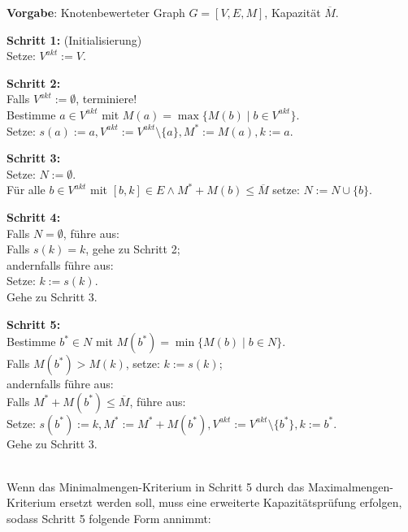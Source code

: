 \newpage
\begin{algo}
\label{Algo Huborientiertes Verfahren TS}
\textbf{Vorgabe}: Knotenbewerteter Graph $G=[V,E,M]$, Kapazität $\overline{M}$.

\noindent 
\textbf{Schritt 1:} (Initialisierung)\\
\phantom \quad Setze: $V^{akt} := V$.

\noindent 
\textbf{Schritt 2:}\\
\phantom \quad Falls $V^{akt} := \emptyset$, terminiere!\\
\phantom \quad Bestimme $a \in V^{akt}$ mit $M(a) = \max\{M(b) \mid b \in V^{akt}\}$.\\
\phantom \quad Setze: $s(a) := a, V^{akt} := V^{akt} \setminus \{a\}, M^* := M(a), k := a$.

\noindent 
\textbf{Schritt 3:}\\
\phantom \quad Setze: $N := \emptyset$.\\
\phantom \quad Für alle $b \in V^{akt}$ mit $[b,k] \in E \wedge M^* + M(b) \leq \overline{M}$ setze: $N := N \cup \{b\}$.

\noindent 
\textbf{Schritt 4:}\\
\phantom \quad Falls $N = \emptyset$, führe aus:\\
\phantom \quad \qquad Falls $s(k) = k$, gehe zu Schritt 2;\\
\phantom \quad \qquad andernfalls führe aus:\\
\phantom \quad \qquad \qquad Setze: $k := s(k)$.\\
\phantom \quad \qquad \qquad Gehe zu Schritt 3.

\noindent 
\textbf{Schritt 5:}\\
\phantom \quad Bestimme $b^* \in N$ mit $M(b^*) = \min\{M(b) \mid b \in N\}$.\\
\phantom \quad Falls $M(b^*) > M(k)$, setze: $k := s(k)$;\\
\phantom \quad andernfalls führe aus:\\
\phantom \quad \qquad Falls $M^* + M(b^*) \leq \overline{M}$, führe aus:\\
\phantom \quad \qquad \qquad Setze: $s(b^*) := k, M^* := M^* + M(b^*), V^{akt} := V^{akt} \setminus \{b^*\}, k := b^*$.\\
\phantom \quad Gehe zu Schritt 3.
\end{algo}

\phantom \\
\noindent Wenn das Minimalmengen-Kriterium in Schritt 5 durch das Maximalmengen-Kriterium ersetzt werden soll, muss eine erweiterte Kapazitätsprüfung erfolgen, sodass Schritt 5 folgende Form annimmt:\\

